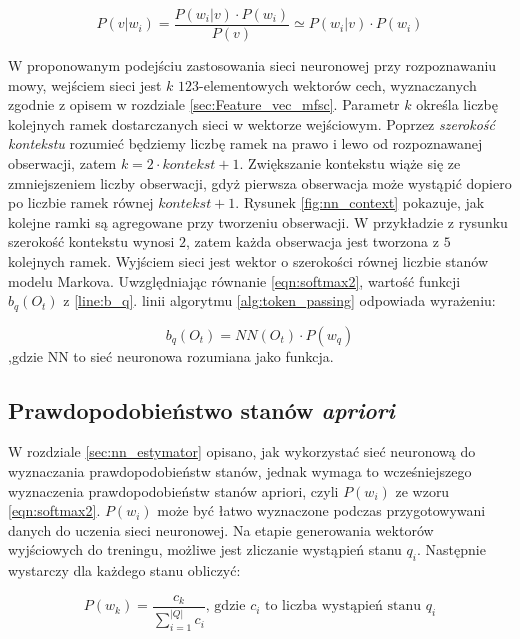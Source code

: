 \documentclass[11pt]{article}
\begin{document}
		\begin{equation}
			P(v|w_i) = \frac{P(w_i|v) \cdot P(w_i)}{P(v)}\simeq P(w_i|v) \cdot P(w_i)
			\label{eqn:softmax2}
		\end{equation}
		
		 W proponowanym podejściu zastosowania sieci neuronowej przy rozpoznawaniu mowy, wejściem sieci jest $k$ $123$-elementowych wektorów cech, wyznaczanych zgodnie z opisem w rozdziale \ref{sec:Feature_vec_mfsc}. Parametr $k$ określa liczbę kolejnych ramek dostarczanych sieci w wektorze wejściowym. Poprzez \textit{szerokość kontekstu} rozumieć będziemy liczbę ramek na prawo i lewo od rozpoznawanej obserwacji, zatem $k = 2 \cdot kontekst + 1$. Zwiększanie kontekstu wiąże się ze zmniejszeniem liczby obserwacji, gdyż pierwsza obserwacja może wystąpić dopiero po liczbie ramek równej $kontekst + 1$. Rysunek \ref{fig:nn_context} pokazuje, jak kolejne ramki są agregowane przy tworzeniu obserwacji. W przykładzie z rysunku szerokość kontekstu wynosi $2$, zatem każda obserwacja jest tworzona z $5$ kolejnych ramek. Wyjściem sieci jest wektor o szerokości równej liczbie stanów modelu Markova. Uwzględniając równanie \ref{eqn:softmax2}, wartość funkcji $b_q(O_t)$ z \ref{line:b_q}. linii algorytmu \ref{alg:token_passing} odpowiada wyrażeniu:
		 
		 \begin{equation}
			 b_q(O_t) = NN(O_t) \cdot P(w_q)			 
		 \end{equation}
		 ,gdzie NN to sieć neuronowa rozumiana jako funkcja.
		
	\subsection{Prawdopodobieństwo stanów \textit{apriori} }
		W rozdziale \ref{sec:nn_estymator} opisano, jak wykorzystać sieć neuronową do wyznaczania prawdopodobieństw stanów, jednak wymaga to wcześniejszego wyznaczenia prawdopodobieństw stanów apriori, czyli $P(w_i)$ ze wzoru \ref{eqn:softmax2}. 
		$P(w_i)$ może być łatwo wyznaczone podczas przygotowywani danych do uczenia sieci neuronowej. Na etapie generowania wektorów wyjściowych do treningu, możliwe jest zliczanie wystąpień stanu $q_i$.
		Następnie wystarczy dla każdego stanu obliczyć:
		
		\begin{equation}
			P(w_k) = \frac{c_k}{\sum_{i=1}^{|Q|} c_i}
			\text{,   gdzie $c_i$ to liczba wystąpień stanu $q_i$}
		\end{equation}
		
\end{document}

